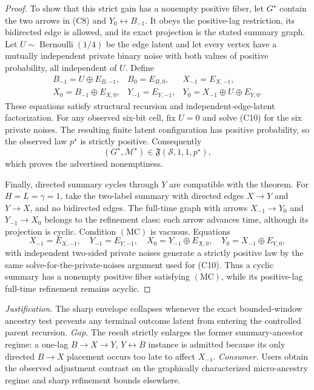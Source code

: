 \documentclass{article}
\begin{document}
\begin{proof}
To show that this strict gain has a nonempty positive fiber, let \(G^{\star}\) contain the two arrows in (C8) and \(Y_0\leftrightarrow B_{-1}\).  It obeys the positive-lag restriction, its bidirected edge is allowed, and its exact projection is the stated summary graph.  Let \(U\sim\operatorname{Bernoulli}(1/4)\) be the edge latent and let every vertex have a mutually independent private binary noise with both values of positive probability, all independent of \(U\).  Define
\[
\begin{array}{lll}
B_{-1}=U\mathbin\oplus E_{B,-1},
&B_0=E_{B,0},
&X_{-1}=E_{X,-1},\\
X_0=B_{-1}\mathbin\oplus E_{X,0},
&Y_{-1}=E_{Y,-1},
&Y_0=X_{-1}\mathbin\oplus U\mathbin\oplus E_{Y,0}.
\end{array}
\tag{C10}
\]
These equations satisfy structural recursion and independent-edge-latent factorization.  For any observed six-bit cell, fix \(U=0\) and solve (C10) for the six private noises.  The resulting finite latent configuration has positive probability, so the observed law \(p^{\star}\) is strictly positive.  Consequently
\[
(G^{\star},\mathcal M^{\star})\in\mathfrak F(\mathcal S,1,1,p^{\star}),
\tag{C11}
\]
which proves the advertised nonemptiness.

Finally, directed summary cycles through \(Y\) are compatible with the theorem.  For \(H=L=\gamma=1\), take the two-label summary with directed edges \(X\to Y\) and \(Y\to X\), and no bidirected edges.  The full-time graph with arrows \(X_{-1}\to Y_0\) and \(Y_{-1}\to X_0\) belongs to the refinement class: each arrow advances time, although its projection is cyclic.  Condition \(\mathrm{(MC)}\) is vacuous.  Equations
\[
X_{-1}=E_{X,-1},
\quad
Y_{-1}=E_{Y,-1},
\quad
X_0=Y_{-1}\mathbin\oplus E_{X,0},
\quad
Y_0=X_{-1}\mathbin\oplus E_{Y,0},
\tag{C12}
\]
with independent two-sided private noises generate a strictly positive law by the same solve-for-the-private-noises argument used for (C10).  Thus a cyclic summary has a nonempty positive fiber satisfying \(\mathrm{(MC)}\), while its positive-lag full-time refinement remains acyclic.
\end{proof}
\par\smallskip\noindent \textit{Justification.} The sharp envelope collapses whenever the exact bounded-window ancestry test prevents any terminal outcome latent from entering the controlled parent recursion. \textit{Gap.} The result strictly enlarges the former summary-ancestor regime: a one-lag \(B\to X\to Y\), \(Y\leftrightarrow B\) instance is admitted because its only directed \(B\to X\) placement occurs too late to affect \(X_{-1}\). \textit{Consumer.} Users obtain the observed adjustment contrast on the graphically characterized micro-ancestry regime and sharp refinement bounds elsewhere.
\end{document}
